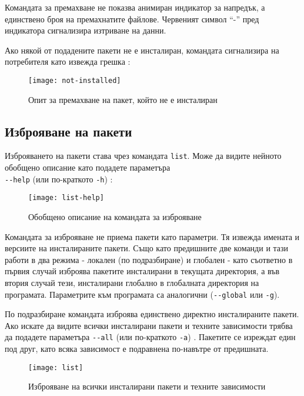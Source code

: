 Командата за премахване не показва анимиран индикатор за напредък, а единствено
броя на премахнатите файлове. Червеният символ ``-'' пред индикатора сигнализира
изтриване на данни.

Ако някой от подадените пакети не е инсталиран, командата сигнализира на
потребителя като извежда грешка :

\begin{figure}[h]
    \centering
    \texttt{[image: not-installed]}
    \caption{Опит за премахване на пакет, който не е инсталиран}
    \label{fig:not-installed}
\end{figure}


\subsection{Изброяване на пакети}

Изброяването на пакети става чрез командата \texttt{list}. Може да видите
нейното обобщено описание като подадете параметъра \\
\texttt{-{}-help} (или по-краткото \texttt{-h}) :

\begin{figure}[H]
    \centering
    \texttt{[image: list-help]}
    \caption{Обобщено описание на командата за изброяване}
    \label{fig:list-help}
\end{figure}

Командата за изброяване не приема пакети като параметри. Тя извежда имената и
версиите на инсталираните пакети. Също като предишните две команди и тази работи
в два режима - локален (по подразбиране) и глобален - като съответно в първия
случай изброява пакетите инсталирани в текущата директория, а във втория случай
тези, инсталирани глобално в глобалната директория на програмата. Параметрите
към програмата са аналогични (\texttt{-{}-global} или \texttt{-g}).

По подразбиране командата изброява единствено директно инсталираните пакети.
Ако искате да видите всички инсталирани пакети и техните зависимости трябва да
подадете параметъра \texttt{-{}-all} (или по-краткото \texttt{-a})
. Пакетите се изреждат един под друг, като всяка зависимост е
подравнена по-навътре от предишната.

\begin{figure}[h]
    \centering
    \texttt{[image: list]}
    \caption{Изброяване на всички инсталирани пакети и техните зависимости}
    \label{fig:list}
\end{figure}


